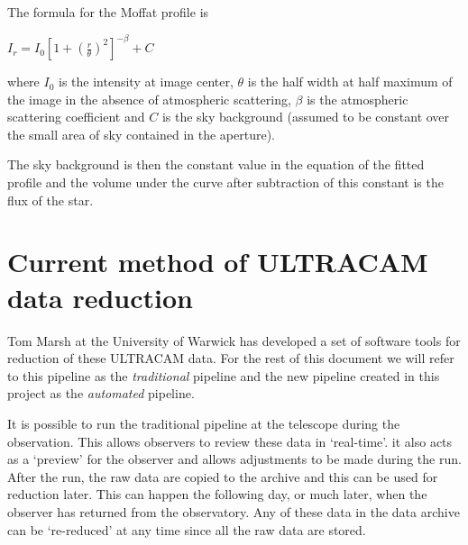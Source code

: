 The formula for the Moffat profile is 

$ I_r = I_0 {[1 + {(\frac{r}{\theta})}^2]}^{-\beta} + C$

where $I_0$ is the intensity at image center, $\theta$ is the half width at half maximum of the image in the absence of atmospheric scattering, $\beta$ is the atmospheric scattering coefficient and $C$ is the sky background (assumed to be constant over the small area of sky contained in the aperture). 

The sky background is then the constant value in the equation of the fitted profile and the volume under the curve after subtraction of this constant is the flux of the star. 

\section{Current method of ULTRACAM data reduction}
Tom Marsh at the University of Warwick has developed a set of software tools for reduction of these ULTRACAM data. For the rest of this document we will refer to this pipeline as the \emph{traditional} pipeline and the new pipeline created in this project as the \emph{automated} pipeline. 

It is possible to run the traditional pipeline at the telescope during the observation. This allows observers to review these data in `real-time'. it also acts as a `preview' for the observer and allows adjustments to be made during the run. After the run, the raw data are copied to the archive and this can be used for reduction later. This can happen the following day, or much later, when the observer has returned from the observatory. Any of these data in the data archive can be `re-reduced' at any time since all the raw data are stored. 

